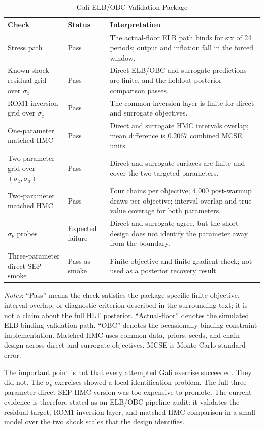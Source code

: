 \documentclass[12pt]{article}
\newcommand{\techappendixnotes}[1]{%
  \par\smallskip
  \noindent\begin{minipage}{0.92\textwidth}%
  \footnotesize #1%
  \end{minipage}\par%
}
\begin{document}
\begin{table}[htbp]
\centering
\caption{Gal\'i ELB/OBC Validation Package}
\label{tab:tech_gali_package}
\begin{tabular}{p{}p{}p{}}
\toprule
Check & Status & Interpretation \\
\midrule
Stress path & Pass & The actual-floor ELB path binds for six of 24 periods; output
and inflation fall in the forced window. \\
Known-shock residual grid over \(\sigma_z\) & Pass & Direct ELB/OBC and surrogate
predictions are finite, and the holdout posterior comparison passes. \\
ROM1-inversion grid over \(\sigma_z\) & Pass & The common inversion layer is
finite for direct and surrogate objectives. \\
One-parameter matched HMC & Pass & Direct and surrogate HMC intervals overlap;
mean difference is 0.2067 combined MCSE units. \\
Two-parameter grid over \((\sigma_z,\sigma_a)\) & Pass & Direct and surrogate
surfaces are finite and cover the two targeted parameters. \\
Two-parameter matched HMC & Pass & Four chains per objective; 4,000
post-warmup draws per objective; interval overlap and true-value coverage for
both parameters. \\
\(\sigma_\nu\) probes & Expected failure & Direct and surrogate agree, but the
short design does not identify the parameter away from the boundary. \\
Three-parameter direct-SEP smoke & Pass as smoke & Finite objective and
finite-gradient check; not used as a posterior recovery result. \\
\bottomrule
\end{tabular}
\techappendixnotes{\textit{Notes}: ``Pass'' means the check satisfies the
package-specific finite-objective, interval-overlap, or diagnostic criterion
described in the surrounding text; it is not a claim about the full HLT
posterior. ``Actual-floor'' denotes the simulated ELB-binding validation path.
``OBC'' denotes the occasionally-binding-constraint implementation. Matched HMC
uses common data, priors, seeds, and chain design across direct and surrogate
objectives. MCSE is Monte Carlo standard error.}
\end{table}

The important point is not that every attempted Gal\'i exercise succeeded.
They did not. The \(\sigma_\nu\) exercises showed a local identification
problem. The full three-parameter direct-SEP HMC version was too expensive to
promote. The current evidence is therefore stated as an ELB/OBC pipeline audit:
it validates the residual target, ROM1 inversion layer, and matched-HMC
comparison in a small model over the two shock scales that the design
identifies.
\end{document}
